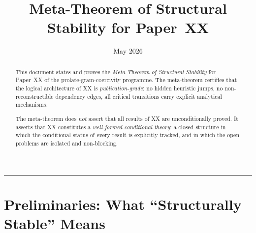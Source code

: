 \documentclass[12pt,a4paper]{amsart}
\theoremstyle{definition}
\begin{document}
\title{Meta-Theorem of Structural Stability for Paper~XX}
\date{May 2026}
\maketitle

\begin{abstract}
This document states and proves the \emph{Meta-Theorem of Structural
Stability} for Paper~XX of the prolate-gram-coercivity programme.
The meta-theorem certifies that the logical architecture of XX is
\emph{publication-grade}: no hidden heuristic jumps, no
non-reconstructible dependency edges, all critical transitions
carry explicit analytical mechanisms.

The meta-theorem does \emph{not} assert that all results of XX are
unconditionally proved. It asserts that XX constitutes a
\emph{well-formed conditional theory}: a closed structure in which
the conditional status of every result is explicitly tracked,
and in which the open problems are isolated and non-blocking.
\end{abstract}

\tableofcontents
\bigskip\hrule\bigskip

\section{Preliminaries: What ``Structurally Stable'' Means}
\label{sec:prelim}
\end{document}
